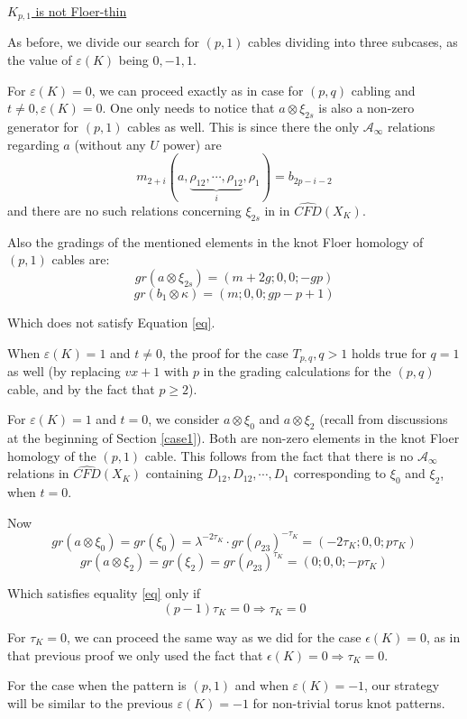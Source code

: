 \documentclass[11pt,reqno]{amsart}
\theoremstyle{definition}
\newtheorem *{remark}{Remark}
\begin{document}
\begin{subsection}{\underline{$K_{p,1}$ is not Floer-thin}}
    
    
As before, we divide our search for $(p,1)$ cables dividing into three subcases, as the value of $\varepsilon(K)$ being $0,-1,1$. 

For $\varepsilon(K) = 0$, we can proceed exactly as in case for $(p,q)$ cabling and $t \neq 0, \varepsilon(K) = 0$. One only needs to notice that $a \otimes \xi_{2s}$ is also a non-zero generator for $(p,1)$ cables as well. This is since there the only $\mathcal{A}_{\infty}$ relations regarding $a$ (without any $U$ power) are
\[m_{2+i}(a,\underbrace{\rho_{12},\cdots, \rho_{12}}_{i}, \rho_1) = b_{2p-i-2}\]
and there are no such relations concerning $\xi_{2s}$ in in $\widehat{CFD}(X_K)$. 

Also the gradings of the mentioned elements in the knot Floer homology of $(p,1)$ cables are:
\[gr(a \otimes \xi_{2s}) = (m+2g;0,0;-gp)\] \[gr(b_1 \otimes \kappa) = (m;0,0;gp-p+1)\]

Which does not satisfy Equation \ref{eq}.



When $\varepsilon(K) = 1$ and $t \neq 0$, the proof for the case $T_{p,q}, q>1$ holds true for $q=1$ as well (by replacing $vx+1$ with $p$ in the grading calculations for the $(p,q)$ cable, and by the fact that $p \geq 2$).

For $\varepsilon(K) = 1$ and $t=0$, we consider $a \otimes \xi_0$ and $a \otimes \xi_2$ (recall from discussions at the beginning of Section \ref{case1}). Both are non-zero elements in the knot Floer homology of the $(p,1)$ cable. This follows from the fact that there is no $\mathcal{A}_{\infty}$ relations in $\widehat{CFD}(X_K)$ containing $D_{12}, D_{12}, \cdots, D_1$ corresponding to $\xi_0$ and $\xi_2$, when $t=0$.  

Now \[gr(a\otimes \xi_0) = gr(\xi_0) = \lambda^{-2\tau_K} \cdot gr(\rho_{23})^{-\tau_K} = (-2\tau_K;0,0;p\tau_K)\] 
\[gr(a\otimes \xi_2) = gr(\xi_2) = gr(\rho_{23})^{\tau_K} = (0;0,0;-p\tau_K)\]

Which satisfies equality \ref{eq} only if 
\[(p-1)\tau_K = 0 \Rightarrow \tau_K =0\]

For $\tau_K = 0$, we can proceed the same way as we did for the case $\epsilon(K) = 0$, as in that previous proof we only used the fact that $\epsilon(K) = 0 \Rightarrow \tau_K = 0$.


For the case when the pattern is $(p,1)$ and when $\varepsilon(K)= -1$, our strategy will be similar to the previous $\varepsilon(K)=-1$ for non-trivial torus knot patterns. 


\end{subsection}
\end{document}
